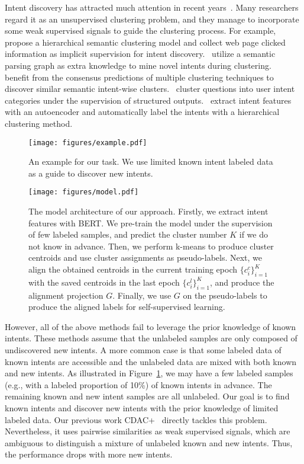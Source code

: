 \documentclass[letterpaper]{article} \usepackage{aaai21}  \usepackage{times}  \usepackage{helvet} \usepackage{courier}  \usepackage[hyphens]{url}  \usepackage{graphicx} \urlstyle{rm} \def\UrlFont{\rm}  \usepackage{natbib}  \usepackage{caption} \frenchspacing  \setlength{\pdfpagewidth}{8.5in}  \setlength{\pdfpageheight}{11in}  \usepackage{amsmath}
\begin{document}
	
	Intent discovery has attracted much attention in recent years~\cite{perkins-yang-2019-dialog,ijcai2020-532,10.1145/3366423.3380268}. Many researchers regard it as an unsupervised clustering problem, and they manage to incorporate some weak supervised signals to guide the clustering process. For example,~\citet{hakkani-tr2013a} propose a hierarchical semantic clustering model and collect web page clicked information as implicit supervision for intent discovery.~\citet{hakkani2015clustering} utilize a semantic parsing graph as extra knowledge to mine novel intents during clustering.~\citet{Padmasundari2018} benefit from the consensus predictions of multiple clustering techniques to discover similar semantic intent-wise clusters.~\citet{haponchyk2018supervised} cluster questions into user intent categories under the supervision of structured outputs.~\citet{shi2018auto} extract intent features with an autoencoder and automatically label the intents with a hierarchical clustering method.
	\begin{figure}[t!]
		\centering  
		\texttt{[image: figures/example.pdf]}
		\caption{\label{example} An example for our task. We use limited known intent labeled data as a guide to discover new intents. }
	\end{figure}
	\begin{figure*}
		\centering
		\texttt{[image: figures/model.pdf]}
		\caption{The model architecture of our approach. Firstly, we extract intent features with BERT. We pre-train the model under the supervision of few labeled samples, and predict the cluster number $K$ if we do not know in advance. Then, we perform k-means to produce cluster centroids and use cluster assignments as pseudo-labels. Next, we align the obtained centroids in the current training epoch $\{c_{i}^{c}\}_{i=1}^{K}$ with the saved centroids in the last epoch $\{c_{i}^{l}\}_{i=1}^{K}$, and produce the alignment projection $G$. Finally, we use $G$ on the pseudo-labels to produce the aligned labels for self-supervised learning.}
		\label{model}
	\end{figure*}

	However, all of the above methods fail to leverage the prior knowledge of known intents. These methods assume that the unlabeled samples are only composed of undiscovered new intents. A more common case is that some labeled data of known intents are accessible and the unlabeled data are mixed with both known and new intents. As illustrated in Figure~\ref{example}, we may have a few labeled samples (e.g., with a labeled proportion of 10\%) of known intents in advance. The remaining known and new intent samples are all unlabeled. Our goal is to find known intents and discover new intents with the prior knowledge of limited labeled data. Our previous work CDAC+~\cite{lin2020discovering} directly tackles this problem. Nevertheless, it uses pairwise similarities as weak supervised signals, which are ambiguous to distinguish a mixture of unlabeled known and new intents. Thus, the performance drops with more new intents.
	
\end{document}
